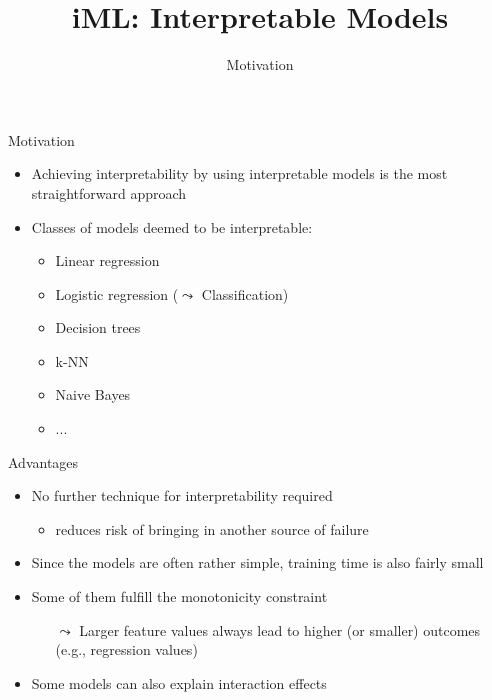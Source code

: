 \documentclass[aspectratio=169]{../latex_main/tntbeamer}  %
\title[Introduction]{iML: Interpretable Models}
\subtitle{Motivation}
\begin{document}
	
	\maketitle


\begin{frame}[c]{Motivation}

    \begin{itemize}
        \item Achieving interpretability by using interpretable models is the most straightforward approach
        \pause
        \item Classes of models deemed to be interpretable:
        \begin{itemize}
            \item Linear regression
            \item Logistic regression ($\leadsto$ Classification)
            \item Decision trees
            \item k-NN
            \item Naive Bayes
            \item ...
        \end{itemize}
    \end{itemize}	
	
\end{frame}
	
\begin{frame}[c]{Advantages}

    \begin{itemize}
        \item No further technique for interpretability required
        \begin{itemize}
            \item reduces risk of bringing in another source of failure
        \end{itemize}
        \pause
        \medskip
        \item Since the models are often rather simple, training time is also fairly small
        \pause
        \medskip
        \item Some of them fulfill the monotonicity constraint
        \begin{itemize}
            \item[$\leadsto$] Larger feature values always lead to higher (or smaller) outcomes (e.g., regression values)
        \end{itemize}
        \pause
        \medskip
        \item Some models can also explain interaction effects
    \end{itemize}	
	
\end{frame}
\end{document}
